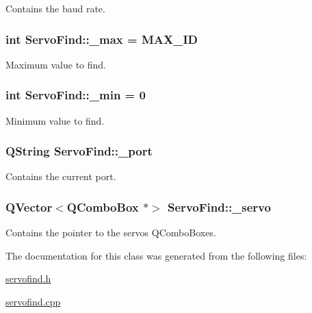 Contains the baud rate. 

\hypertarget{a00008_abb4bcc300ab0a9c1df3c41b4e7d1fe2d}{}
\subsubsection[{\+\_\+max}]{\setlength{\rightskip}{0pt plus 5cm}int Servo\+Find\+::\+\_\+max = M\+A\+X\+\_\+\+I\+D\hspace{0.3cm}{\ttfamily [private]}}\label{a00008_abb4bcc300ab0a9c1df3c41b4e7d1fe2d}


Maximum value to find. 

\hypertarget{a00008_a65a3d5606c9a8bcd6ace9be36c3551e1}{}
\subsubsection[{\+\_\+min}]{\setlength{\rightskip}{0pt plus 5cm}int Servo\+Find\+::\+\_\+min = 0\hspace{0.3cm}{\ttfamily [private]}}\label{a00008_a65a3d5606c9a8bcd6ace9be36c3551e1}


Minimum value to find. 

\hypertarget{a00008_acc6d9f94a8cf7a7a777fd9c818d98207}{}
\subsubsection[{\+\_\+port}]{\setlength{\rightskip}{0pt plus 5cm}Q\+String Servo\+Find\+::\+\_\+port\hspace{0.3cm}{\ttfamily [private]}}\label{a00008_acc6d9f94a8cf7a7a777fd9c818d98207}


Contains the current port. 

\hypertarget{a00008_a571ee1fc45255666e5baa0d5e9111551}{}
\subsubsection[{\+\_\+servo}]{\setlength{\rightskip}{0pt plus 5cm}Q\+Vector$<$Q\+Combo\+Box $\ast$$>$ Servo\+Find\+::\+\_\+servo\hspace{0.3cm}{\ttfamily [private]}}\label{a00008_a571ee1fc45255666e5baa0d5e9111551}


Contains the pointer to the servos Q\+Combo\+Boxes. 



The documentation for this class was generated from the following files\+:\begin{DoxyCompactItemize}
\item 
\hyperlink{a00022}{servofind.\+h}\item 
\hyperlink{a00021}{servofind.\+cpp}\end{DoxyCompactItemize}
